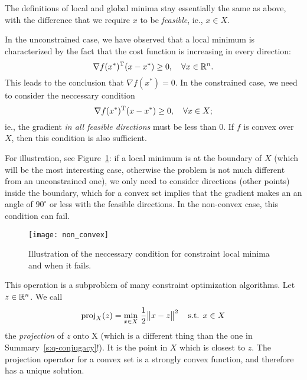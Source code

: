 \documentclass{article}
\begin{document}
The definitions of local and global minima stay essentially the same as above, with the difference
that we require \(x\) to be \emph{feasible}, ie., \(x \in X\).


\label{s:constrained-optimality}

In the unconstrained case, we have observed that a local minimum is characterized by the fact that
the cost function is increasing in every direction:
\begin{equation*}
  \nabla f(x^*)^{\mathrm{T}}(x - x^*) \geq 0, \quad\forall x \in \mathbb{R}^n.
\end{equation*}
This leads to the conclusion that \(\nabla f(x^*) = 0\). In the constrained case, we need to
consider the neccessary condition
\begin{equation*}
  \nabla f(x^*)^{\mathrm{T}}(x - x^*) \geq 0, \quad\forall x \in X;
\end{equation*}
ie., the gradient \emph{in all feasible directions} must be less than \(0\).  If \(f\) is convex
over \(X\), then this condition is also sufficient.

For illustration, see Figure~\ref{fig:non-convex}: if a local minimum is at the boundary of \(X\)
(which will be the most interesting case, otherwise the problem is not much different from an
unconstrained one), we only need to consider directions (other points) inside the boundary, which
for a convex set implies that the gradient makes an an angle of \(90^\circ\) or less with the
feasible directions.  In the non-convex case, this condition can fail.

\begin{figure}[H]
  \centering
  \texttt{[image: non\_convex]}
  \caption{Illustration of the neccessary condition for constraint local minima and when it
    fails.\label{fig:non-convex}}
\end{figure}


\label{s:projection-operator}

This operation is a subproblem of many constraint optimization algorithms.  Let \(z \in \mathbb{R}^n\).  We
call
\begin{equation*}
  \proj_X(z) = \min_{x \in X}\, \frac{1}{2}\enVert[1]{x - z}^2 \quad\text{s.t. } x \in X
\end{equation*}
the \emph{projection} of \(z\) onto X (which is a different thing than the one in
Summary~\ref{s:q-conjugacy}!).  It is the point in \(X\) which is closest to \(z\).  The projection
operator for a convex set is a strongly convex function, and therefore has a unique solution.
\end{document}
